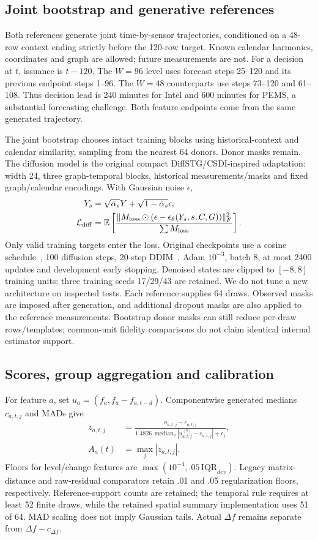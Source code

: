 \documentclass[conference]{IEEEtran}
\newcommand{\E}{\mathbb E}
\begin{document}
\subsection{Joint bootstrap and generative references}
Both references generate joint time-by-sensor trajectories, conditioned on a
48-row context ending strictly before the 120-row target. Known calendar
harmonics, coordinates and graph are allowed; future measurements are not.
For a decision at $t$, issuance is $t-120$. The $W=96$ level uses forecast
steps 25--120 and its previous endpoint steps 1--96. The $W=48$ counterparts
use steps 73--120 and 61--108. Thus decision lead is 240 minutes for Intel
and 600 minutes for PEMS, a substantial forecasting challenge. Both feature
endpoints come from the same generated trajectory.

The joint bootstrap chooses intact training blocks using historical-context
and calendar similarity, sampling from the nearest 64 donors. Donor masks
remain. The diffusion model is the original compact DiffSTG/CSDI-inspired
adaptation: width 24, three graph-temporal blocks, historical measurements/masks
and fixed graph/calendar encodings. With Gaussian noise $\epsilon$,
\begin{align}
Y_s&=\sqrt{\bar\alpha_s}Y+\sqrt{1-\bar\alpha_s}\epsilon,\\
\mathcal L_{\rm diff}&=\E\left[
\frac{\|M_{\rm loss}\odot(\epsilon-\epsilon_\theta(Y_s,s,C,G))\|_F^2}
{\sum M_{\rm loss}}\right].\label{eq:diff}
\end{align}
Only valid training targets enter the loss. Original checkpoints use a cosine
schedule~\cite{cosine}, 100 diffusion steps, 20-step DDIM~\cite{ddim}, Adam
$10^{-3}$, batch 8, at most 2400 updates and development early stopping.
Denoised states are clipped to $[-8,8]$ training units; three training seeds
17/29/43 are retained. We do not tune a new architecture on inspected tests.
Each reference supplies 64 draws. Observed masks are imposed after generation,
and additional dropout masks are also applied to the reference measurements.
Bootstrap donor masks can still reduce per-draw rows/templates; common-unit
fidelity comparisons do not claim identical internal estimator support.

\subsection{Scores, group aggregation and calibration}
For feature $a$, set $u_a=(f_a, f_a-f_{a,t-d})$. Componentwise generated medians
$c_{a,t,j}$ and MADs give
\begin{align}
z_{a,t,j}&=\frac{u_{a,t,j}-c_{a,t,j}}
{1.4826\,\operatorname{median}_b|u^{(b)}_{a,t,j}-c_{a,t,j}|+\epsilon_j},\\
A_a(t)&=\max_j|z_{a,t,j}|.\label{eq:score}
\end{align}
Floors for level/change features are $\max(10^{-4},.05\,\mathrm{IQR}_{dev})$.
Legacy matrix-distance and raw-residual comparators retain .01 and .05
regularization floors, respectively. Reference-support counts are retained;
the temporal rule requires at least 52 finite draws, while the retained spatial
summary implementation uses 51 of 64. MAD scaling does not imply Gaussian tails.
Actual $\Delta f$ remains separate from $\Delta f-c_{\Delta f}$.
\end{document}

